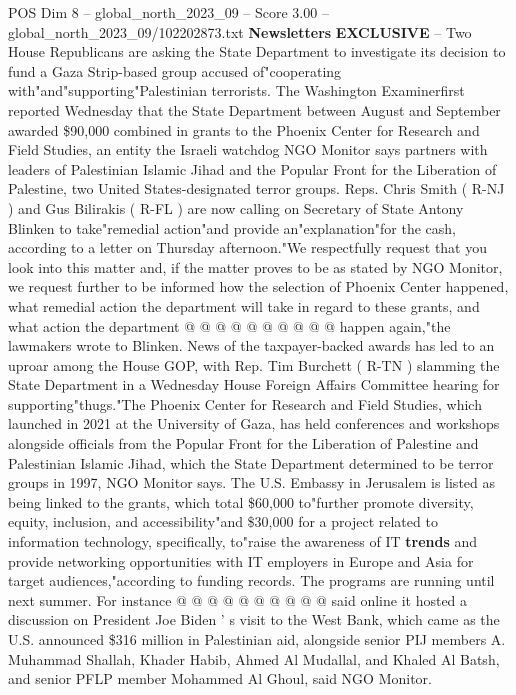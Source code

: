 \begin{textsample}{POS Dim 8 – global\_north\_2023\_09 – Score 3.00 – global\_north\_2023\_09/102202873.txt}  \label{ex:f8_pos_123}
\textbf{Newsletters} \textbf{EXCLUSIVE} -- Two House Republicans are asking the State Department to investigate its decision to fund a Gaza Strip-based group accused of"cooperating with"and"supporting"Palestinian terrorists.
The Washington Examinerfirst reported Wednesday that the State Department between August and September awarded \$90,000 combined in grants to the Phoenix Center for Research and Field Studies, an entity the Israeli watchdog NGO Monitor says partners with leaders of Palestinian Islamic Jihad and the Popular Front for the Liberation of Palestine, two United States-designated terror groups.
Reps.
Chris Smith ( R-NJ ) and Gus Bilirakis ( R-FL ) are now calling on Secretary of State Antony Blinken to take"remedial action"and provide an"explanation"for the cash, according to a letter on Thursday afternoon."We respectfully request that you look into this matter and, if the matter proves to be as stated by NGO Monitor, we request further to be informed how the selection of Phoenix Center happened, what remedial action the department will take in regard to these grants, and what action the department @ @ @ @ @ @ @ @ @ @ happen again,"the lawmakers wrote to Blinken.
News of the taxpayer-backed awards has led to an uproar among the House GOP, with Rep.
Tim Burchett ( R-TN ) slamming the State Department in a Wednesday House Foreign Affairs Committee hearing for supporting"thugs."The Phoenix Center for Research and Field Studies, which launched in 2021 at the University of Gaza, has held conferences and workshops alongside officials from the Popular Front for the Liberation of Palestine and Palestinian Islamic Jihad, which the State Department determined to be terror groups in 1997, NGO Monitor says.
The U.S.
Embassy in Jerusalem is listed as being linked to the grants, which total \$60,000 to"further promote diversity, equity, inclusion, and accessibility"and \$30,000 for a project related to information technology, specifically, to"raise the awareness of IT \textbf{trends} and provide networking opportunities with IT employers in Europe and Asia for target audiences,"according to funding records.
The programs are running until next summer.
For instance @ @ @ @ @ @ @ @ @ @ said online it hosted a discussion on President Joe Biden ' s visit to the West Bank, which came as the U.S. announced \$316 million in Palestinian aid, alongside senior PIJ members A.
Muhammad Shallah, Khader Habib, Ahmed Al Mudallal, and Khaled Al Batsh, and senior PFLP member Mohammed Al Ghoul, said NGO Monitor.

\end{textsample}
